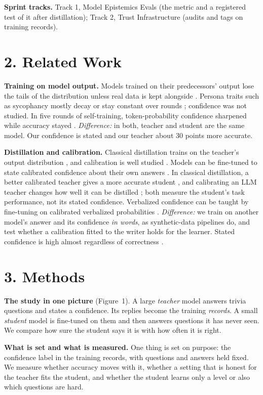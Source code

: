 \documentclass[10pt]{article}
\begin{document}
\textbf{Sprint tracks.} Track 1, Model Epistemics Evals (the metric and a registered test of it after distillation); Track 2, Trust Infrastructure (audits and tags on training records).

\section*{2. Related Work}

\textbf{Training on model output.} Models trained on their predecessors' output lose the tails of the distribution \cite{shumailov} unless real data is kept alongside \cite{gerstgrasser}. Persona traits such as sycophancy mostly decay or stay constant over rounds \cite{roe}; confidence was not studied. In five rounds of self-training, token-probability confidence sharpened while accuracy stayed \cite{sumit}. \emph{Difference:} in both, teacher and student are the same model. Our confidence is stated and our teacher about 30 points more accurate.

\textbf{Distillation and calibration.} Classical distillation trains on the teacher's output distribution \cite{hinton}, and calibration is well studied \cite{guo}. Models can be fine-tuned to state calibrated confidence about their own answers \cite{lin,tian}. In classical distillation, a better calibrated teacher gives a more accurate student \cite{kdcal}, and calibrating an LLM teacher changes how well it can be distilled \cite{zhan}; both measure the student's task performance, not its stated confidence. Verbalized confidence can be taught by fine-tuning on calibrated verbalized probabilities \cite{uncdist}. \emph{Difference:} we train on another model's answer and its confidence \emph{in words}, as synthetic-data pipelines do, and test whether a calibration fitted to the writer holds for the learner. Stated confidence is high almost regardless of correctness \cite{xiong,kalai}.

\section*{3. Methods}

\textbf{The study in one picture} (Figure~1). A large \emph{teacher} model answers trivia questions and states a confidence. Its replies become the training \emph{records}. A small \emph{student} model is fine-tuned on them and then answers questions it has never seen. We compare how sure the student says it is with how often it is right.

\textbf{What is set and what is measured.} One thing is set on purpose: the confidence label in the training records, with questions and answers held fixed. We measure whether accuracy moves with it, whether a setting that is honest for the teacher fits the student, and whether the student learns only a level or also which questions are hard.
\end{document}
